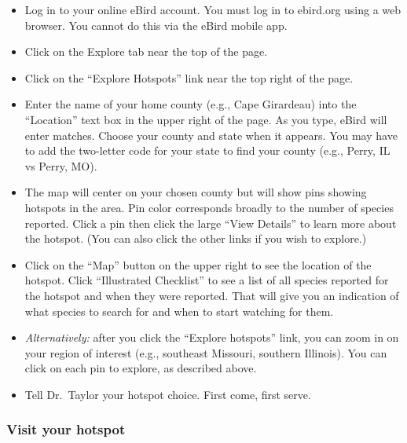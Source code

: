 \documentclass[12pt]{article}
\begin{document}
\begin{itemize}
\item Log in to your online eBird account. You must log in to ebird.org using a web browser. You cannot do this via the eBird mobile app.

\item Click on the Explore tab near the top of the page.

\item Click on the “Explore Hotspots” link near the top right of the page.

\item Enter the name of your home county (e.g., Cape Girardeau) into the “Location” text box in the upper right of the page. As you type, eBird will enter matches.  Choose your county and state when it appears. You may have to add the two-letter code for your state to find your county (e.g., Perry, IL vs Perry, MO).

\item The map will center on your chosen county but will show pins showing hotspots in the area. Pin color corresponds broadly to the number of species reported. Click a pin then click the large “View Details” to learn more about the hotspot. (You can also click the other links if you wish to explore.)

\item Click on the “Map” button on the upper right to see the location of the hotspot. Click “Illustrated Checklist” to see a list of all species reported for the hotspot and when they were reported. That will give you an indication of what species to search for and when to start watching for them.

\item \textit{Alternatively:} after you click the “Explore hotspots” link, you can zoom in on your region of interest (e.g., southeast Missouri, southern Illinois). You can click on each pin to explore, as described above.

\item Tell Dr.~Taylor your hotspot choice. First come, first serve.

\end{itemize}

\subsubsection*{Visit your hotspot}
\end{document}
